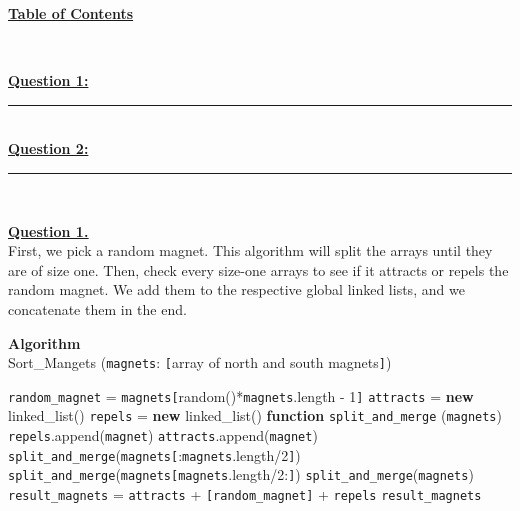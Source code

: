 \documentclass[12pt]{article}
\begin{document}
\begin{center}
	\hypertarget{toc}{\LARGE \underline{\textbf{Table of Contents}}}\\
\end{center}

\hyperlink{1}{\textbf{Question 1:}}
\vspace{1mm}
\hrule
\vspace{1mm} \leavevmode \\

\hyperlink{2}{\textbf{Question 2:}}
\vspace{1mm}
\hrule
\vspace{1mm} \leavevmode \\

\newpage

\hyperlink{toc}{\hypertarget{1}{\LARGE \underline{\textbf{Question 1.}}}}\\

First, we pick a random magnet. This algorithm will split the arrays until they are of size one.
Then, check every size-one arrays to see if it attracts or repels the random magnet.
We add them to the respective global linked lists, and we concatenate them in the end.
\begin{algorithm}
	\caption*{\textbf{Algorithm}\\Sort\_Mangets \big(\texttt{magnets}: \texttt{[}array of north and south magnets\texttt{]}\big)}\label{alg:cap}
	\begin{algorithmic}[1]
		\State \texttt{random\_magnet} = \texttt{magnets}\texttt{[}random()*\texttt{magnets}.length - 1\texttt{]}
		\State \texttt{attracts} = \textbf{new} linked\_list()
		\State \texttt{repels} = \textbf{new} linked\_list()
		\State
		\State \textbf{function} \texttt{split\_and\_merge} (\texttt{magnets})\Indent
					\State\texttt{repels}.append(\texttt{magnet})
				\Else
					\State\texttt{attracts}.append(\texttt{magnet})
				\EndIf
				\State\Return
			\EndIf
			\State
			\State \texttt{split\_and\_merge}(\texttt{magnets[}:\texttt{magnets}.length/2\texttt{]})
			\State \texttt{split\_and\_merge}(\texttt{magnets[}\texttt{magnets}.length/2:\texttt{]})
		\EndIndent
		\State
		\State \texttt{split\_and\_merge}(\texttt{magnets})
		\State \texttt{result\_magnets} = \texttt{attracts} + \texttt{[random\_magnet]} + \texttt{repels}
		\State\Return \texttt{result\_magnets}
	\end{algorithmic}
\end{algorithm}
\end{document}
